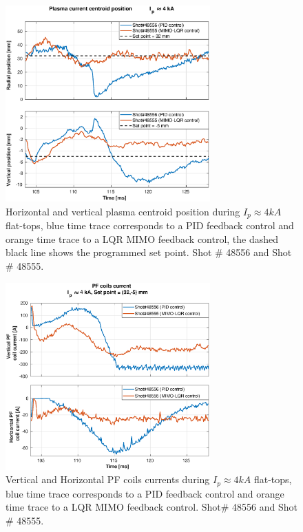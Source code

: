 \begin{figure}
	\centering
	\includegraphics[width=0.7\textwidth]{Chp5/PIDvsMIMO_556_555_2.eps}
	\caption{Horizontal and vertical plasma centroid position during  $I_p\approx 4kA$  flat-tops, blue time trace corresponds to a PID feedback control and orange time trace to a LQR MIMO feedback control, the dashed black line shows the programmed set point. Shot $\#$ 48556 and Shot $\#$ 48555.}
\end{figure}

\begin{figure}
	\centering
	\includegraphics[width=0.7\textwidth]{Chp5/PIDvsMIMO_556_555_curr_2.eps}
	\caption{  Vertical and Horizontal PF coils currents during  $I_p\approx 4kA$  flat-tops, blue time trace corresponds to a PID feedback control and orange time trace to a LQR MIMO feedback control.  Shot$\#$ 48556 and Shot$\#$ 48555.}
\end{figure}

